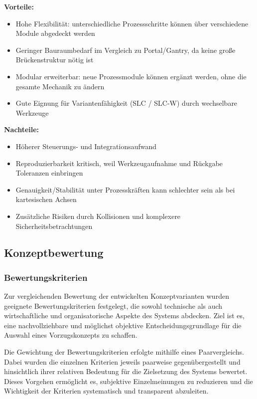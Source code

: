 \textbf{Vorteile:}
\begin{itemize}
    \item Hohe Flexibilität: unterschiedliche Prozessschritte können über verschiedene Module abgedeckt werden
    \item Geringer Bauraumbedarf im Vergleich zu Portal/Gantry, da keine große Brückenstruktur nötig ist
    \item Modular erweiterbar: neue Prozessmodule können ergänzt werden, ohne die gesamte Mechanik zu ändern
    \item Gute Eignung für Variantenfähigkeit (SLC / SLC-W) durch wechselbare Werkzeuge
\end{itemize}

\textbf{Nachteile:}
\begin{itemize}
    \item Höherer Steuerungs- und Integrationsaufwand
    \item Reproduzierbarkeit kritisch, weil Werkzeugaufnahme und Rückgabe Toleranzen einbringen
    \item Genauigkeit/Stabilität unter Prozesskräften kann schlechter sein als bei kartesischen Achsen
    \item Zusätzliche Risiken durch Kollisionen und komplexere Sicherheitsbetrachtungen
\end{itemize}

\subsection{Konzeptbewertung}
\subsubsection{Bewertungskriterien}
\label{sec:Bewertungskriterien}
Zur vergleichenden Bewertung der entwickelten Konzeptvarianten wurden geeignete Bewertungskriterien festgelegt, die sowohl technische als auch wirtschaftliche und organisatorische Aspekte des Systems abdecken. Ziel ist es, eine nachvollziehbare und möglichst objektive Entscheidungsgrundlage für die Auswahl eines Vorzugskonzepts zu schaffen.\cite{MKon_VL, ZangemeisterNutzwertanalyse}

Die Gewichtung der Bewertungskriterien erfolgte mithilfe eines Paarvergleichs. Dabei wurden die einzelnen Kriterien jeweils paarweise gegenübergestellt und hinsichtlich ihrer relativen Bedeutung für die Zielsetzung des Systems bewertet. Dieses Vorgehen ermöglicht es, subjektive Einzelmeinungen zu reduzieren und die Wichtigkeit der Kriterien systematisch und transparent abzuleiten.\cite{MKon_VL, ZangemeisterNutzwertanalyse}

